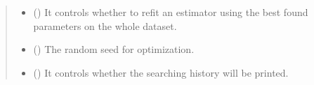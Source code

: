 \documentclass[letterpaper,10pt,english]{sphinxmanual}
\begin{document}
\begin{fulllineitems}
\begin{quote}
\begin{description}
\begin{itemize}
\item {} 
 (\sphinxstyleliteralemphasis{\sphinxupquote{, }}\sphinxstyleliteralemphasis{\sphinxupquote{, }}) \textendash{} It controls whether to refit an estimator using the best found parameters on the whole dataset.

\item {} 
 (\sphinxstyleliteralemphasis{\sphinxupquote{, }}\sphinxstyleliteralemphasis{\sphinxupquote{, }}) \textendash{} The random seed for optimization.

\item {} 
 (\sphinxstyleliteralemphasis{\sphinxupquote{, }}\sphinxstyleliteralemphasis{\sphinxupquote{, }}) \textendash{} It controls whether the searching history will be printed.

\end{itemize}

\end{description}\end{quote}


\end{fulllineitems}
\end{document}
